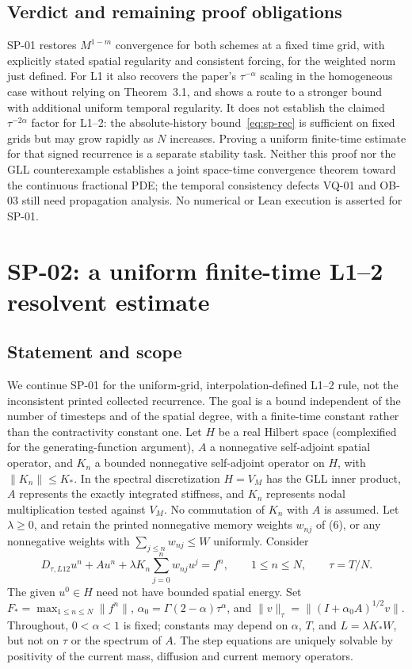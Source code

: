 \documentclass[11pt,a4paper]{amsart}
\theoremstyle{remark}
\theoremstyle{plain}
\theoremstyle{remark}
\numberwithin{equation}{section}
\begin{document}
\subsection{Verdict and remaining proof obligations}
SP-01 restores $M^{1-m}$ convergence for both schemes at a fixed time grid, with explicitly stated spatial regularity and consistent forcing, for the weighted norm just defined. For L1 it also recovers the paper's $\tau^{-\alpha}$ scaling in the homogeneous case without relying on Theorem~3.1, and shows a route to a stronger bound with additional uniform temporal regularity. It does not establish the claimed $\tau^{-2\alpha}$ factor for L1--2: the absolute-history bound~\eqref{eq:sp-rec} is sufficient on fixed grids but may grow rapidly as $N$ increases. Proving a uniform finite-time estimate for that signed recurrence is a separate stability task. Neither this proof nor the GLL counterexample establishes a joint space-time convergence theorem toward the continuous fractional PDE; the temporal consistency defects VQ-01 and OB-03 still need propagation analysis. No numerical or Lean execution is asserted for SP-01.


\section{SP-02: a uniform finite-time L1--2 resolvent estimate}
\label{sec:sp02}

\subsection{Statement and scope}
We continue SP-01 for the uniform-grid, interpolation-defined L1--2 rule, not the inconsistent printed collected recurrence. The goal is a bound independent of the number of timesteps and of the spatial degree, with a finite-time constant rather than the contractivity constant one. Let $H$ be a real Hilbert space (complexified for the generating-function argument), $A$ a nonnegative self-adjoint spatial operator, and $K_n$ a bounded nonnegative self-adjoint operator on $H$, with $\|K_n\|\le K_*$. In the spectral discretization $H=V_M$ has the GLL inner product, $A$ represents the exactly integrated stiffness, and $K_n$ represents nodal multiplication tested against $V_M$. No commutation of $K_n$ with $A$ is assumed. Let $\lambda\ge0$, and retain the printed nonnegative memory weights $w_{nj}$ of (6), or any nonnegative weights with $\sum_{j\le n}w_{nj}\le W$ uniformly. Consider
\begin{equation}\label{eq:sp02-evolution}
 D_{\tau,L12}u^n+Au^n+\lambda K_n\sum_{j=0}^nw_{nj}u^j=f^n,
 \qquad 1\le n\le N,\qquad \tau=T/N.
\end{equation}
The given $u^0\in H$ need not have bounded spatial energy. Set $F_* =\max_{1\le n\le N}\|f^n\|$, $\alpha_0=\Gamma(2-\alpha)\tau^\alpha$, and $\|v\|_\tau=\|(I+\alpha_0 A)^{1/2}v\|$. Throughout, $0<\alpha<1$ is fixed; constants may depend on $\alpha$, $T$, and $L=\lambda K_*W$, but not on $\tau$ or the spectrum of $A$. The step equations are uniquely solvable by positivity of the current mass, diffusion and current memory operators.
\end{document}
